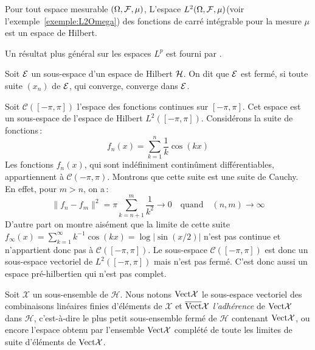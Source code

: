 \begin{proposition}[Espaces $L^2$]
  Pour tout espace mesurable $(\Omega,\mathcal{F},\mu)$, L'espace
  $L^2(\Omega,\mathcal{F},\mu)$(voir l'exemple~\ref{exemple:L2Omega}) des fonctions de
  carr\'{e} int\'{e}grable pour la mesure $\mu$ est un espace de Hilbert.
\end{proposition}
Un r\'{e}sultat plus g\'{e}n\'{e}ral sur les espaces $L^p$ est fourni par
\cite[proposition~6 du chapitre~6, page~126]{royden:1988}.
\begin{definition}
Soit $\cal E$ un sous-espace d'un espace de Hilbert $\cal H$. On
dit que $\cal E$ est ferm\'{e}, si toute suite $(x_n)$ de $\cal E$,
qui converge, converge dans $\cal E$.
\end{definition}
\begin{example}
 \label{exe:C2pi}
Soit $\mathcal{C}([-\pi,\pi])$ l'espace des fonctions continues
sur $[-\pi,\pi]$. Cet espace est un sous-espace de
l'espace de Hilbert $L^2([-\pi,\pi])$. Consid\'{e}rons la suite de fonctions\,:
\[
 f_n(x)= \sum_{k=1}^n \frac{1}{k} \cos(kx)
\]
Les fonctions $f_n(x)$, qui sont ind\'{e}finiment contin\^{u}ment
diff\'{e}rentiables,  appartiennent \`{a} $\mathcal{C}(-\pi,\pi)$.
Montrons que cette suite est une suite de Cauchy. En effet, pour
$m > n$, on a\,:
\[
  \| f_n - f_m \|^2 =
    \pi \sum_{k=n+1}^m \frac{1}{k^2} \longrightarrow 0
    \quad \mbox{quand} \quad (n,m) \rightarrow \infty
\]
D'autre part on montre ais\'{e}ment que la limite de cette suite
$f_\infty(x) = \sum_{k=1}^\infty k^{-1} \cos(kx)= \log
|\sin(x/2)|$ n'est pas continue et n'appartient donc pas \`{a}
$\mathcal{C}([-\pi,\pi])$.
Le sous-espace  $\mathcal{C}([-\pi,\pi])$ est donc un sous-espace vectoriel de
$L^2([-\pi,\pi])$ mais n'est pas ferm\'{e}. C'est donc aussi un espace
pr\'{e}-hilbertien qui n'est pas complet.
\end{example}
\begin{definition}
\label{def:espace-engendre}
Soit $\mathcal{X}$ un sous-ensemble de $\mathcal{H}$. Nous notons
$\mathrm{Vect}{\mathcal{X}}$ le sous-espace vectoriel des combinaisons lin\'{e}aires
finies d'\'{e}l\'{e}ments de $\mathcal{X}$ et $\overline{\mathrm{Vect}}{\mathcal{X}}$ \emph{l'adh\'{e}rence}
de $\mathrm{Vect}{\mathcal{X}}$ dans $\mathcal{H}$, c'est-\`{a}-dire le plus petit
sous-ensemble ferm\'{e} de $\mathcal{H}$ contenant $\mathrm{Vect}{\mathcal{X}}$, ou encore
l'espace obtenu par l'ensemble $\mathrm{Vect}{\mathcal{X}}$ compl\'{e}t\'{e} de toute les
limites de suite d'\'{e}l\'{e}ments de $\mathrm{Vect}{\mathcal{X}}$.
\end{definition}
